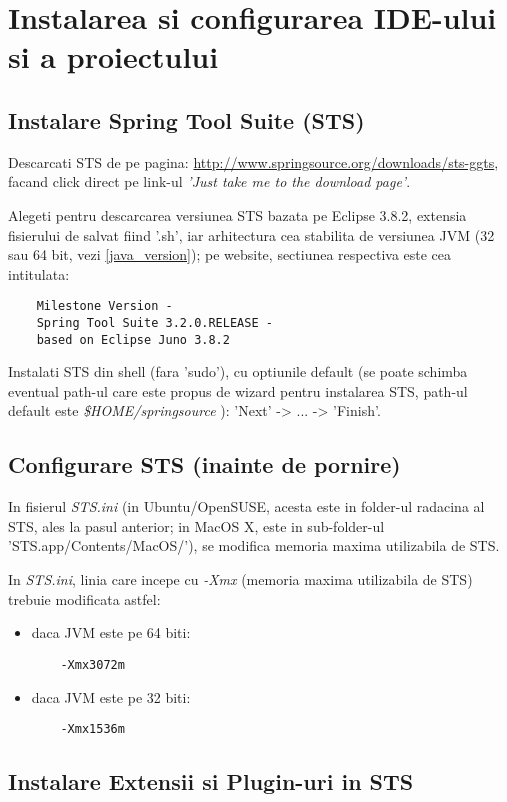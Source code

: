 \section{Instalarea si configurarea IDE-ului si a proiectului}

\subsection{Instalare Spring Tool Suite (STS)}
Descarcati STS de pe pagina:
\url{http://www.springsource.org/downloads/sts-ggts},
facand click direct pe link-ul \emph{'Just take me to the download page'}.

Alegeti pentru descarcarea versiunea STS bazata pe Eclipse 3.8.2, extensia
fisierului de salvat fiind '.sh', iar arhitectura cea stabilita de versiunea
JVM (32 sau 64 bit, vezi \ref{java_version}); pe website, sectiunea respectiva
este cea intitulata:
\begin{verbatim}
	Milestone Version - 
	Spring Tool Suite 3.2.0.RELEASE - 
	based on Eclipse Juno 3.8.2
\end{verbatim}

Instalati STS din shell (fara 'sudo'), cu optiunile default (se poate
schimba eventual path-ul care este propus de wizard pentru instalarea STS,
path-ul default este \emph{\$HOME/springsource} ):
'Next' -> ... -> 'Finish'.

\subsection{Configurare STS (inainte de pornire)}
In fisierul \emph{STS.ini} (in Ubuntu/OpenSUSE, acesta este in folder-ul
radacina al STS, ales la pasul anterior; in MacOS X, este in sub-folder-ul
'STS.app/Contents/MacOS/'), se modifica memoria maxima utilizabila de STS.

In \emph{STS.ini}, linia care incepe cu \emph{-Xmx} 
(memoria maxima utilizabila de STS) 
trebuie modificata astfel:
\begin{itemize} 
\item daca JVM este pe 64 biti:
\begin{lstlisting}
	-Xmx3072m
\end{lstlisting}
\item daca JVM este pe 32 biti:
\begin{lstlisting}
	-Xmx1536m
\end{lstlisting}
\end{itemize}

\subsection{Instalare Extensii si Plugin-uri in STS}

